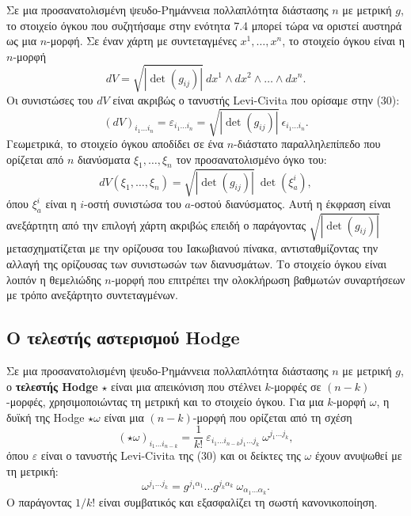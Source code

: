 \documentclass[12pt]{article}
\begin{document}
Σε μια προσανατολισμένη ψευδο-Ρημάννεια πολλαπλότητα διάστασης \( n \) με μετρική \( g \), το στοιχείο όγκου που συζητήσαμε στην ενότητα 7.4 μπορεί τώρα να οριστεί αυστηρά ως μια \( n \)-μορφή. Σε έναν χάρτη με συντεταγμένες \( x^1, \dots, x^n \), το στοιχείο όγκου είναι η \( n \)-μορφή
\[
dV = \sqrt{|\det(g_{ij})|} \ dx^1 \wedge dx^2 \wedge \dots \wedge dx^n. \tag{43}
\]
Οι συνιστώσες του \( dV \) είναι ακριβώς ο τανυστής Levi-Civita που ορίσαμε στην (30):
\[
(dV)_{i_1 \dots i_n} = \varepsilon_{i_1 \dots i_n} = \sqrt{|\det(g_{ij})|} \ \epsilon_{i_1 \dots i_n}.
\]
Γεωμετρικά, το στοιχείο όγκου αποδίδει σε ένα \( n \)-διάστατο παραλληλεπίπεδο που ορίζεται από \( n \) διανύσματα \( \xi_1, \dots, \xi_n \) τον προσανατολισμένο όγκο του:
\[
dV(\xi_1, \dots, \xi_n) = \sqrt{|\det(g_{ij})|} \ \det(\xi^i_a),
\]
όπου \( \xi^i_a \) είναι η \( i \)-οστή συνιστώσα του \( a \)-οστού διανύσματος. Αυτή η έκφραση είναι ανεξάρτητη από την επιλογή χάρτη ακριβώς επειδή ο παράγοντας \( \sqrt{|\det(g_{ij})|} \) μετασχηματίζεται με την ορίζουσα του Ιακωβιανού πίνακα, αντισταθμίζοντας την αλλαγή της ορίζουσας των συνιστωσών των διανυσμάτων. Το στοιχείο όγκου είναι λοιπόν η θεμελιώδης \( n \)-μορφή που επιτρέπει την ολοκλήρωση βαθμωτών συναρτήσεων με τρόπο ανεξάρτητο συντεταγμένων.

\subsection{Ο τελεστής αστερισμού Hodge}

Σε μια προσανατολισμένη ψευδο-Ρημάννεια πολλαπλότητα διάστασης \( n \) με μετρική \( g \), ο \textbf{τελεστής Hodge} \( \star \) είναι μια απεικόνιση που στέλνει \( k \)-μορφές σε \( (n-k) \)-μορφές, χρησιμοποιώντας τη μετρική και το στοιχείο όγκου. Για μια \( k \)-μορφή \( \omega \), η δυϊκή της Hodge \( \star \omega \) είναι μια \( (n-k) \)-μορφή που ορίζεται από τη σχέση
\[
(\star \omega)_{i_1 \dots i_{n-k}} = \frac{1}{k!} \ \varepsilon_{i_1 \dots i_{n-k} j_1 \dots j_k} \ \omega^{j_1 \dots j_k}, \tag{44}
\]
όπου \( \varepsilon \) είναι ο τανυστής Levi-Civita της (30) και οι δείκτες της \( \omega \) έχουν ανυψωθεί με τη μετρική:
\[
\omega^{j_1 \dots j_k} = g^{j_1 \alpha_1} \dots g^{j_k \alpha_k} \ \omega_{\alpha_1 \dots \alpha_k}.
\]
Ο παράγοντας \( 1/k! \) είναι συμβατικός και εξασφαλίζει τη σωστή κανονικοποίηση.
\end{document}
